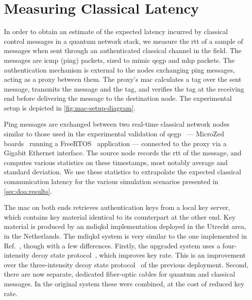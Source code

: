 \section{Measuring Classical Latency}
\label{sec:doa:latency}

In order to obtain an estimate of the expected latency incurred by classical control messages in a
quantum network stack, we measure the \acrfull{rtt} of a sample of messages when sent through an
authenticated classical channel in the field. The messages are \acrshort{icmp} (ping) packets, sized
to mimic \acrshort{qegp} and \acrshort{mhp} packets. The authentication mechanism is external to the
nodes exchanging ping messages, acting as a proxy between them. The proxy's \acrshort{mac}
calculates a tag over the sent message, transmits the message and the tag, and verifies the tag at
the receiving end before delivering the message to the destination node. The experimental setup is
depicted in \cref{fig:mac-setup-diagram}.

Ping messages are exchanged between two real-time classical network nodes similar to those used in
the experimental validation of \acrshort{qegp}~\cite{pompili_2022_experimental} --- MicroZed
boards~\cite{microzed} running a FreeRTOS~\cite{freertos} application --- connected to the proxy via
a Gigabit Ethernet interface. The source node records the \acrshort{rtt} of the message, and
computes various statistics on these timestamps, most notably average and standard deviation. We use
these statistics to extrapolate the expected classical communication latency for the various
simulation scenarios presented in \cref{sec:doa:results}.

The \acrfull{mac} on both ends retrieves authentication keys from a local key server, which contains
key material identical to its counterpart at the other end. Key material is produced by an
\acrshort{mdiqkd} implementation deployed in the Utrecht area, in the Netherlands. The
\acrshort{mdiqkd} system is very similar to the one implemented in
Ref.~\cite{berrevoets_2022_deployed}, though with a few differences. Firstly, the upgraded system
uses a four-intensity decoy state protocol~\cite{zhou_2016_making, woodward_2021_gigahertz}, which
improves key rate. This is an improvement over the three-intensity decoy state
protocol~\cite{yu_2013_three} of the previous deployment. Second, there are now separate, dedicated
fiber-optic cables for quantum and classical messages. In the original system these were combined,
at the cost of reduced key rate.

